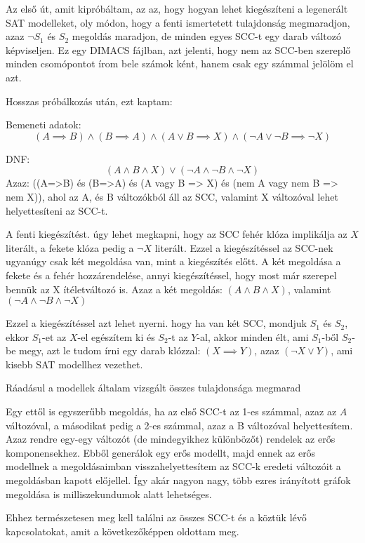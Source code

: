 \documentclass[
]{thesis-ekf}
\theoremstyle{definition}
\theoremstyle{remark}
\begin{document}
	Az első út, amit kipróbáltam, az az, hogy hogyan lehet kiegészíteni a legenerált SAT modelleket, oly módon, hogy a fenti ismertetett tulajdonság megmaradjon, azaz $\neg S_1$ és $ S_2 $ megoldás maradjon, de minden egyes SCC-t egy darab változó képviseljen. Ez egy DIMACS fájlban, azt jelenti, hogy nem az SCC-ben szereplő minden csomópontot írom bele számok ként, hanem csak egy számmal jelölöm el azt.
	
	Hosszas próbálkozás után, ezt kaptam:
	
	Bemeneti adatok:
	\[ (A\implies B)\wedge(B\implies A)\wedge(A\vee B \implies X)\wedge(\neg A\vee\neg B\implies\neg X) \]

	DNF:
	\[ (A\wedge B\wedge X)\vee(\neg A\wedge\neg B\wedge\neg X) \]	
	Azaz: ((A=>B) és (B=>A) és (A vagy B => X) és (nem A vagy nem B => nem X)), ahol az A, és B változókból áll az SCC, valamint X változóval lehet helyettesíteni az SCC-t.
	
	A fenti kiegészítést. úgy lehet megkapni, hogy az SCC fehér klóza implikálja az $ X $ literált, a fekete klóza pedig a $ \neg X $	literált. Ezzel a kiegészítéssel az SCC-nek ugyanúgy csak két megoldása van, mint a kiegészítés előtt. A két megoldása a fekete és a fehér hozzárendelése, annyi kiegészítéssel, hogy most már szerepel bennük az X ítéletváltozó is. Azaz a két megoldás: $ (A \wedge B \wedge X) $, valamint $ (\neg A \wedge \neg B \wedge \neg X) $
	
	Ezzel a kiegészítéssel azt lehet nyerni. hogy ha van két SCC, mondjuk $ S_1 $ és $ S_2 $, ekkor $ S_1 $-et az $ X $-el egészítem ki és $ S_2 $-t az $ Y $-al, akkor minden élt, ami $ S_1 $-ből $ S_2 $-be megy, azt le tudom írni egy darab klózzal: $ (X\implies Y) $, azaz $ (\neg X\vee Y) $, ami kisebb SAT modellhez vezethet.

	Ráadásul a modellek általam vizsgált összes tulajdonsága megmarad
	
	Egy ettől is egyszerűbb megoldás, ha az első SCC-t az 1-es számmal, azaz az $ A $ változóval, a másodikat pedig a 2-es számmal, azaz a B változóval helyettesítem. Azaz rendre egy-egy változót (de mindegyikhez különbözőt) rendelek az erős komponensekhez. Ebből generálok egy erős modellt, majd ennek az erős modellnek a megoldásaimban visszahelyettesítem az SCC-k eredeti változóit a megoldásban kapott előjellel. Így akár nagyon nagy, több ezres irányított gráfok megoldása is milliszekundumok alatt lehetséges.
	
	Ehhez természetesen meg kell találni az összes SCC-t és a köztük lévő kapcsolatokat, amit a következőképpen oldottam meg.
	
\end{document}
